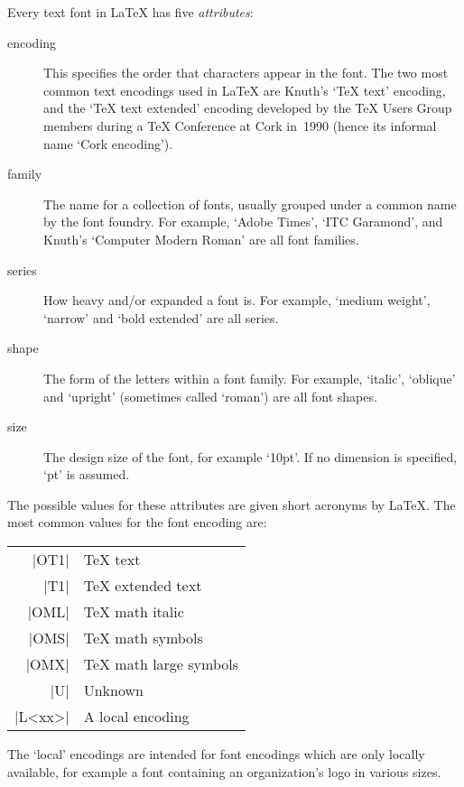 \documentclass{ltxguide}[1995/11/28]
\begin{document}
Every text font in \LaTeX{} has five \emph{attributes}:
\begin{description}

\item[encoding] This specifies the order that characters appear in the
  font.  The two most common text encodings used in \LaTeX{} are Knuth's
  `\TeX{} text' encoding, and the `\TeX{} text extended' encoding
  developed by the \TeX{} Users Group members during a \TeX{} Conference
  at Cork in~1990 (hence its informal name `Cork encoding').

\item[family] The name for a collection of fonts, usually grouped under
  a common name by the font foundry.  For example, `Adobe Times', `ITC
  Garamond', and Knuth's `Computer Modern Roman' are all font families.

\item[series] How heavy and/or expanded a font is.  For example, `medium
  weight', `narrow' and `bold extended' are all series.

\item[shape] The form of the letters within a font family.  For example,
  `italic', `oblique' and `upright' (sometimes called `roman') are all
  font shapes.

\item[size] The design size of the font, for example `10pt'. If no
  dimension is specified, `pt' is assumed.

\end{description}
The possible values for these attributes are given short acronyms by
\LaTeX.  The most common values for the font encoding are:
\begin{center}
  \begin{minipage}{.7\linewidth}
    \begin{tabular}{rl}
      |OT1|   & \TeX{} text  \\
      |T1|    & \TeX{} extended text \\
      |OML|   & \TeX{} math italic \\
      |OMS|   & \TeX{} math symbols \\
      |OMX|   & \TeX{} math large symbols \\
      |U|     & Unknown \\
      |L<xx>| & A local encoding
    \end{tabular}
  \end{minipage}
\end{center}
The `local' encodings are intended for font encodings which are only
locally available, for example a font containing an organization's logo
in various sizes.
\end{document}
